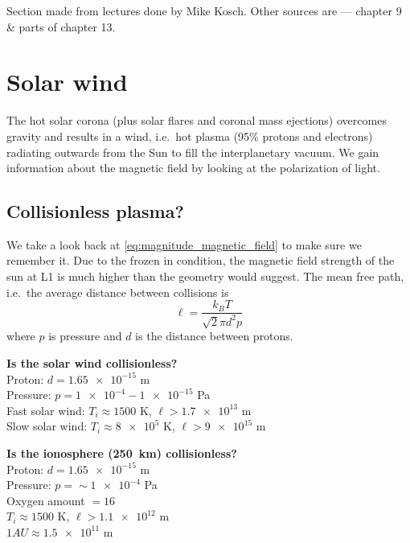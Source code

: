 \begin{remark}
    Section made from lectures done by Mike Kosch. Other sources are \citet{1995Itsp} --- chapter 9 \& parts of chapter 13.
\end{remark}

\section{Solar wind}
The hot solar corona (plus solar flares and coronal mass ejections) overcomes gravity and results in a wind, i.e.\ hot plasma (95\% protons and electrons) radiating outwards from the Sun to fill the interplanetary vacuum. We gain information about the magnetic field by looking at the polarization of light.

\subsection{Collisionless plasma?}
We take a look back at \cref{eq:magnitude_magnetic_field} to make sure we remember it. Due to the frozen in condition, the magnetic field strength of the sun at L1 is much higher than the geometry would suggest. The mean free path, i.e.\ the average distance between collisions is
\begin{equation*}
    \ell=\frac{k_{B}T}{\sqrt{2}\pi d^2p}
\end{equation*}
where \(p\) is pressure and \(d\) is the distance between protons.\\
\begin{minipage}[t]{.5\linewidth}
    \textbf{Is the solar wind collisionless?}\\
    Proton: \(d=\num{1.65e-15}\) m\\
    Pressure: \(p=\num{1e-4}-\num{1e-15}\) Pa\\
    Fast solar wind: \(T_i\approx 1500\) K, \(\ell >\num{1.7e13}\) m\\
    Slow solar wind: \(T_i\approx \num{8e5}\) K, \(\ell >\num{9e15}\) m
\end{minipage}
\begin{minipage}[t]{.5\linewidth}
    \textbf{Is the ionosphere (\SI{250}{\kilo\metre}) collisionless?}\\
    Proton: \(d=\num{1.65e-15}\) m\\
    Pressure: \(p=\sim\num{1e-4}\) Pa\\
    Oxygen amount \(=16\) \\
    \(T_i\approx 1500\) K, \(\ell >\num{1.1e12}\) m\\
    \(1 AU \approx\num{1.5e11}\) m
\end{minipage}

